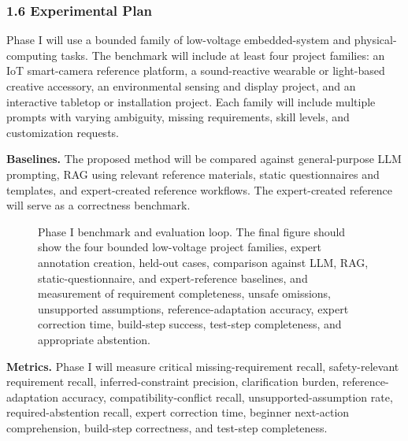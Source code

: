 \subsubsection*{1.6 Experimental Plan}

Phase I will use a bounded family of low-voltage embedded-system and physical-computing tasks. The benchmark will include at least four project families: an IoT smart-camera reference platform, a sound-reactive wearable or light-based creative accessory, an environmental sensing and display project, and an interactive tabletop or installation project. Each family will include multiple prompts with varying ambiguity, missing requirements, skill levels, and customization requests.

\textbf{Baselines.} The proposed method will be compared against general-purpose LLM prompting, RAG using relevant reference materials, static questionnaires and templates, and expert-created reference workflows. The expert-created reference will serve as a correctness benchmark.

\begin{figure}[H]
\centering
{}
\caption{Phase I benchmark and evaluation loop. The final figure should show the four bounded low-voltage project families, expert annotation creation, held-out cases, comparison against LLM, RAG, static-questionnaire, and expert-reference baselines, and measurement of requirement completeness, unsafe omissions, unsupported assumptions, reference-adaptation accuracy, expert correction time, build-step success, test-step completeness, and appropriate abstention.}
\label{fig:benchmark_evaluation_loop}
\end{figure}


\textbf{Metrics.} Phase I will measure critical missing-requirement recall, safety-relevant requirement recall, inferred-constraint precision, clarification burden, reference-adaptation accuracy, compatibility-conflict recall, unsupported-assumption rate, required-abstention recall, expert correction time, beginner next-action comprehension, build-step correctness, and test-step completeness.

